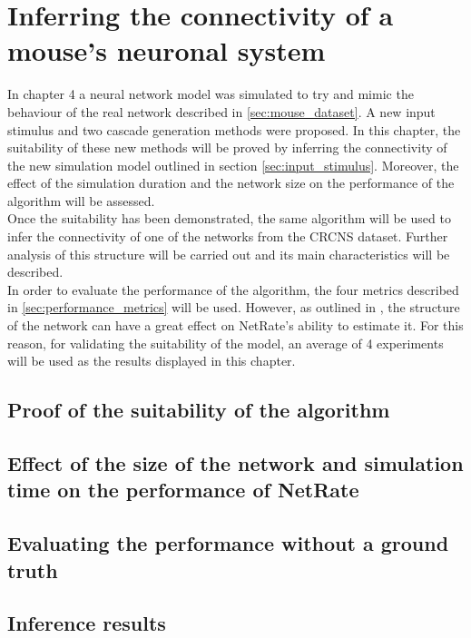 
\chapter{Inferring the connectivity of a mouse's neuronal system}

In chapter 4 a neural network model was simulated to try and mimic the behaviour of the real network described in \ref{sec:mouse_dataset}. A new input stimulus and two cascade generation methods were proposed. In this chapter, the suitability of these new methods will be proved by inferring the connectivity of the new simulation model outlined in section \ref{sec:input_stimulus}. Moreover, the effect of the simulation duration and the network size on the performance of the algorithm will be assessed.\\

Once the suitability has been demonstrated, the same algorithm will be used to infer the connectivity of one of the networks from the CRCNS dataset. Further analysis of this structure will be carried out and its main characteristics will be described.\\

In order to evaluate the performance of the algorithm, the four metrics described in \ref{sec:performance_metrics} will be used. However, as outlined in \cite{pranav_report}, the structure of the network can have a great effect on NetRate's ability to estimate it. For this reason, for validating the suitability of the model, an average of 4 experiments will be used as the results displayed in this chapter.

\section{Proof of the suitability of the algorithm}\label{sec:proof_suitability}


\section{Effect of the size of the network and simulation time on the performance of NetRate}
\section{Evaluating the performance without a ground truth}
\section{Inference results}


